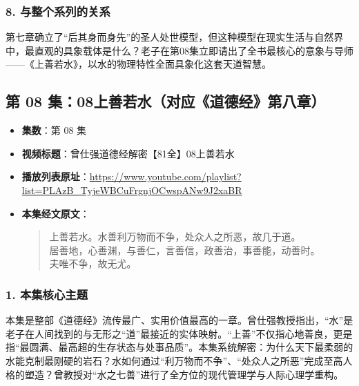 \subsubsection{8. 与整个系列的关系}
第七章确立了“后其身而身先”的圣人处世模型，但这种模型在现实生活与自然界中，最直观的具象载体是什么？老子在第08集立即请出了全书最核心的意象与导师——《上善若水》，以水的物理特性全面具象化这套天道智慧。

\clearpage

\subsection{第 08 集：08上善若水（对应《道德经》第八章）}
\label{sec:ep08}

\begin{itemize}
    \item \textbf{集数}：第 08 集
    \item \textbf{视频标题}：曾仕强道德经解密【81全】08上善若水
    \item \textbf{播放列表原址}：\url{https://www.youtube.com/playlist?list=PLAzB_TyjeWBCuFrgnjOCwspANw9J2xaBR}
    \item \textbf{本集经文原文}：
    \begin{quote}\kaishu
    上善若水。水善利万物而不争，处众人之所恶，故几于道。\\
    居善地，心善渊，与善仁，言善信，政善治，事善能，动善时。\\
    夫唯不争，故无尤。
    \end{quote}
\end{itemize}

\subsubsection{1. 本集核心主题}
本集是整部《道德经》流传最广、实用价值最高的一章。曾仕强教授指出，“水”是老子在人间找到的与无形之“道”最接近的实体映射。“上善”不仅指心地善良，更是指“最圆满、最高超的生存状态与处事品质”。本集系统解密：为什么天下最柔弱的水能克制最刚硬的岩石？水如何通过“利万物而不争”、“处众人之所恶”完成至高人格的塑造？曾教授对“水之七善”进行了全方位的现代管理学与人际心理学重构。

